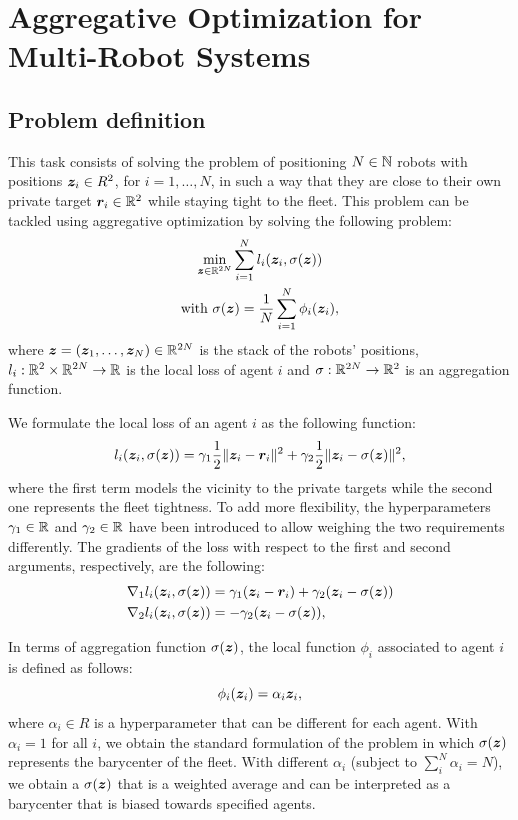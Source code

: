 \documentclass[a4paper,11pt,oneside]{book}
\begin{document}
\chapter{Aggregative Optimization for Multi-Robot Systems} \label{ch:aggregative}


\section{Problem definition}

This task consists of solving the problem of positioning $N \in {\mathbb{N}}$ robots with positions ${\bm{z}}_i \in R^2$, for $i=1, \dots, N$, in such a way that they are close to their own private target ${\bm{r}}_i \in {\mathbb{R}}^2$ while staying tight to the fleet. This problem can be tackled using aggregative optimization by solving the following problem:
\[
      \begin{gathered}
            \min_{{\bm{z}} \in {\mathbb{R}}^{2N}} \sum_{i=1}^{N} l_i({\bm{z}}_i, \sigma({\bm{z}})) \\
            \text{with } \sigma({\bm{z}}) = \frac{1}{N} \sum_{i=1}^{N} \phi_i({\bm{z}}_i),
      \end{gathered}
\]
where ${\bm{z}}=({\bm{z}}_1, \dots, {\bm{z}}_N) \in {\mathbb{R}}^{2N}$ is the stack of the robots' positions, $l_i: {\mathbb{R}}^{2} \times {\mathbb{R}}^{2N} \rightarrow {\mathbb{R}}$ is the local loss of agent $i$ and $\sigma: {\mathbb{R}}^{2N} \rightarrow {\mathbb{R}}^2$ is an aggregation function.

We formulate the local loss of an agent $i$ as the following function:
\[
      l_i({\bm{z}}_i, \sigma({\bm{z}})) = \gamma_1 \frac{1}{2} \Vert {\bm{z}}_i - {\bm{r}}_i \Vert^2 + \gamma_2 \frac{1}{2} \Vert {\bm{z}}_i - \sigma({\bm{z}}) \Vert^2,
\]
where the first term models the vicinity to the private targets while the second one represents the fleet tightness. To add more flexibility, the hyperparameters $\gamma_1 \in {\mathbb{R}}$ and $\gamma_2 \in {\mathbb{R}}$ have been introduced to allow weighing the two requirements differently. The gradients of the loss with respect to the first and second arguments, respectively, are the following:
\[
      \begin{split}
            \nabla_1 l_i({\bm{z}}_i, \sigma({\bm{z}})) &= \gamma_1 ({\bm{z}}_i - {\bm{r}}_i) + \gamma_2 ({\bm{z}}_i - \sigma({\bm{z}})) \\
            \nabla_2 l_i({\bm{z}}_i, \sigma({\bm{z}})) &= -\gamma_2 ({\bm{z}}_i - \sigma({\bm{z}})),
      \end{split}
\]

In terms of aggregation function $\sigma({\bm{z}})$, the local function $\phi_i$ associated to agent $i$ is defined as follows:
\[
      \phi_i({\bm{z}}_i) = \alpha_i {\bm{z}}_i,
\]
where $\alpha_i \in R$ is a hyperparameter that can be different for each agent. With $\alpha_i = 1$ for all $i$, we obtain the standard formulation of the problem in which $\sigma({\bm{z}})$ represents the barycenter of the fleet. With different $\alpha_i$ (subject to $\sum_i^N \alpha_i = N$), we obtain a $\sigma({\bm{z}})$ that is a weighted average and can be interpreted as a barycenter that is biased towards specified agents.
\end{document}
